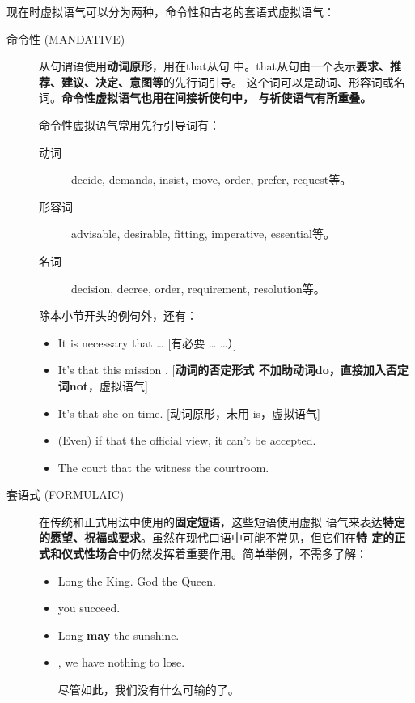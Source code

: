 现在时虚拟语气可以分为两种，命令性和古老的套语式虚拟语气：
\begin{description}
\item[命令性 (MANDATIVE)] 从句谓语使用\textbf{动词原形}，用在that从句
  中。that从句由一个表示\textbf{要求、推荐、建议、决定、意图等}的先行词引导。
  这个词可以是动词、形容词或名词。\textbf{命令性虚拟语气也用在间接祈使句中，
    与祈使语气有所重叠。}

  命令性虚拟语气常用先行引导词有：
  \begin{description}
  \item[动词] decide, demands, insist, move, order, prefer, request等。

  \item[形容词] advisable, desirable, fitting, imperative, essential等。

  \item[名词] decision, decree, order, requirement, resolution等。
  \end{description}

  除本小节开头的例句外，还有：
  \begin{itemize}
  \item  It is necessary that \ldots{} [有必要 \ldots{} \ldots）]
  \item It's  that this mission . [\textbf{动词的否定形式
    不加助动词do，直接加入否定词not}，虚拟语气]
  \item It's  that she  on time. [动词原形，未用 is，虚拟语气]
  \item (Even) if that  the official view, it can't be accepted.

  \item The court  that the witness  the courtroom.
  \end{itemize}

\item[套语式 (FORMULAIC)] 在传统和正式用法中使用的\textbf{固定短语}，这些短语使用虚拟
  语气来表达\textbf{特定的愿望、祝福或要求}。虽然在现代口语中可能不常见，但它们在\textbf{特
    定的正式和仪式性场合}中仍然发挥着重要作用。简单举例，不需多了解：
  \begin{itemize}
  \item Long  the King. God  the Queen.
  \item {} you succeed.
  \item Long \textbf{may} the sunshine.
  \item {}, we have nothing to lose.

    尽管如此，我们没有什么可输的了。
  \end{itemize}
\end{description}

